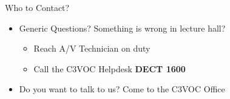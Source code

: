 
\begin{frame}{Who to Contact?}
	\begin{itemize}
		\item Generic Questions? Something is wrong in lecture hall?
		\begin{itemize}
			\item Reach A/V Technician on duty
			\item Call the C3VOC Helpdesk \textbf{DECT 1600}
		\end{itemize}
		\item Do you want to talk to us? Come to the C3VOC Office
	\end{itemize} 
\end{frame}
